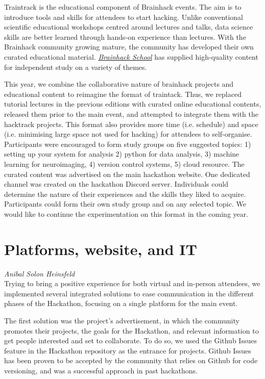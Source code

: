 \documentclass[10pt,a4paper,twocolumns]{proc}
\let\Oldsection\section
\renewcommand{\section}{\FloatBarrier\Oldsection}
\newcommand{\authors}[1]{\emph{\footnotesize #1} \\}
\begin{document}
Traintrack is the educational component of Brainhack events. The aim is
to introduce tools and skills for attendees to start hacking. Unlike
conventional scientific educational workshops centred around lectures
and talks, data science skills are better learned through hands-on
experience than lectures. With the Brainhack community growing mature,
the community has developed their own curated educational material.
\href{https://school.brainhackmtl.org/}{\emph{Brainhack School}} has
supplied high-quality content for independent study on a variety of
themes.

This year, we combine the collaborative nature of brainhack projects and
educational content to reimagine the format of traintack. Thus, we
replaced tutorial lectures in the previous editions with curated online
educational contents, released them prior to the main event, and
attempted to integrate them with the hacktrack projects. This format
also provides more time (i.e. schedule) and space (i.e. minimising large
space not used for hacking) for attendees to self-organise. Participants
were encouraged to form study groups on five suggested topics: 1)
setting up your system for analysis 2) python for data analysis, 3)
machine learning for neuroimaging, 4) version control systems, 5) cloud
resource. The curated content was advertised on the main hackathon
website. One dedicated channel was created on the hackathon Discord
server. Individuals could determine the nature of their experiences and
the skills they liked to acquire. Participants could form their own
study group and on any selected topic. We would like to continue the
experimentation on this format in the coming year.

\section{Platforms, website, and IT}
\authors{Anibal Solon Heinsfeld}
%

Trying to bring a positive experience for both virtual and in-person
attendees, we implemented several integrated solutions to ease
communication in the different phases of the Hackathon, focusing on a
single platform for the main event.

The first solution was the project's advertisement, in which the
community promotes their projects, the goals for the Hackathon, and
relevant information to get people interested and set to collaborate. To
do so, we used the Github Issues feature in the Hackathon
repository as the entrance for projects. Github Issues has been proven
to be accepted by the community that relies on Github for code
versioning, and was a successful approach in past hackathons.
\end{document}
